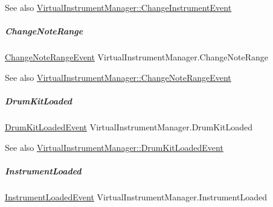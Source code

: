 \begin{DoxySeeAlso}{See also}
\hyperlink{group___virtual_instrument_manager_class_virtual_instrument_manager_1_1_change_instrument_event}{Virtual\+Instrument\+Manager\+::\+Change\+Instrument\+Event} 
\end{DoxySeeAlso}
\mbox{\label{group___virtual_instrument_manager_ab6fa99d08e8466406835b9fc4ff859f1}} 
\subparagraph{\texorpdfstring{Change\+Note\+Range}{ChangeNoteRange}}
{\footnotesize\ttfamily \hyperlink{group___virtual_instrument_manager_class_virtual_instrument_manager_1_1_change_note_range_event}{Change\+Note\+Range\+Event} Virtual\+Instrument\+Manager.\+Change\+Note\+Range}

\begin{DoxySeeAlso}{See also}
\hyperlink{group___virtual_instrument_manager_class_virtual_instrument_manager_1_1_change_note_range_event}{Virtual\+Instrument\+Manager\+::\+Change\+Note\+Range\+Event} 
\end{DoxySeeAlso}
\mbox{\label{group___virtual_instrument_manager_a2dea060b2fba524166433300113dc281}} 
\subparagraph{\texorpdfstring{Drum\+Kit\+Loaded}{DrumKitLoaded}}
{\footnotesize\ttfamily \hyperlink{group___virtual_instrument_manager_class_virtual_instrument_manager_1_1_drum_kit_loaded_event}{Drum\+Kit\+Loaded\+Event} Virtual\+Instrument\+Manager.\+Drum\+Kit\+Loaded}

\begin{DoxySeeAlso}{See also}
\hyperlink{group___virtual_instrument_manager_class_virtual_instrument_manager_1_1_drum_kit_loaded_event}{Virtual\+Instrument\+Manager\+::\+Drum\+Kit\+Loaded\+Event} 
\end{DoxySeeAlso}
\mbox{\label{group___virtual_instrument_manager_ad79b789b020d7e4a8c149ec653c0b97f}} 
\subparagraph{\texorpdfstring{Instrument\+Loaded}{InstrumentLoaded}}
{\footnotesize\ttfamily \hyperlink{group___virtual_instrument_manager_class_virtual_instrument_manager_1_1_instrument_loaded_event}{Instrument\+Loaded\+Event} Virtual\+Instrument\+Manager.\+Instrument\+Loaded}

